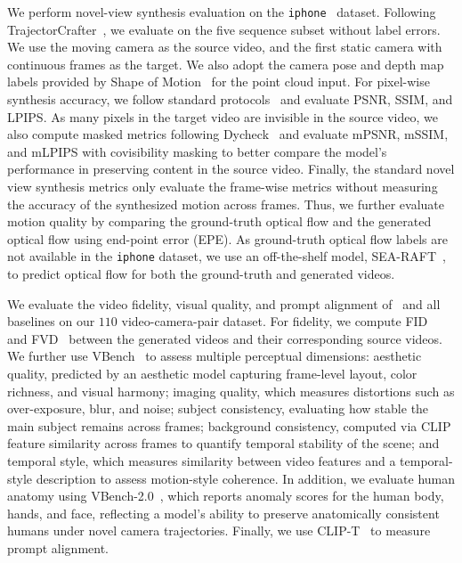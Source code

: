 We perform novel-view synthesis evaluation on the \texttt{iphone}~\cite{gao2022dycheck} dataset. Following TrajectorCrafter~\cite{yu2025trajcraft}, we evaluate on the five sequence subset without label errors. We use the moving camera as the source video, and the first static camera with continuous frames as the target. We also adopt the camera pose and depth map labels provided by Shape of Motion~\cite{wang2025shapeofmotion} for the point cloud input. For pixel-wise synthesis accuracy, we follow standard protocols~\cite{mildenhall2021nerf, kerbl20233d} and evaluate PSNR, SSIM, and LPIPS. As many pixels in the target video are invisible in the source video, we also compute masked metrics following Dycheck~\cite{gao2022dycheck} and evaluate mPSNR, mSSIM, and mLPIPS with covisibility masking to better compare the model's performance in preserving content in the source video. Finally, the standard novel view synthesis metrics only evaluate the frame-wise metrics without measuring the accuracy of the synthesized motion across frames. Thus, we further evaluate motion quality by comparing the ground-truth optical flow and the generated optical flow using end-point error (EPE). As ground-truth optical flow labels are not available in the \texttt{iphone} dataset, we use an off-the-shelf model, SEA-RAFT~\cite{wang2024sea}, to predict optical flow for both the ground-truth and generated videos.

We evaluate the video fidelity, visual quality, and prompt alignment of \methodname\ and all baselines on our $110$ video-camera-pair dataset. For fidelity, we compute FID~\cite{heusel2017fid} and FVD~\cite{uterthiner2019fvd} between the generated videos and their corresponding source videos. We further use VBench~\cite{huang2024vbench} to assess multiple perceptual dimensions: aesthetic quality, predicted by an aesthetic model capturing frame-level layout, color richness, and visual harmony; imaging quality, which measures distortions such as over-exposure, blur, and noise; subject consistency, evaluating how stable the main subject remains across frames; background consistency, computed via CLIP feature similarity across frames to quantify temporal stability of the scene; and temporal style, which measures similarity between video features and a temporal-style description to assess motion-style coherence. In addition, we evaluate human anatomy using VBench-2.0~\cite{zheng2025vbench2}, which reports anomaly scores for the human body, hands, and face, reflecting a model’s ability to preserve anatomically consistent humans under novel camera trajectories. Finally, we use CLIP-T~\cite{radford2021clip} to measure prompt alignment.

